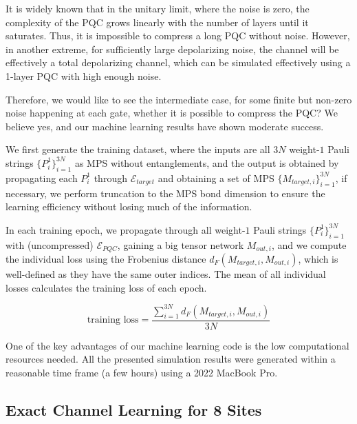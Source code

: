\documentclass[%
 reprint,
superscriptaddress,
 amsmath,amssymb,
 aps,
]{revtex4-2}
\newcommand{\E}{\mathcal{E}}
\begin{document}
It is widely known that in the unitary limit, where the noise is zero, the complexity of the PQC grows linearly with the number of layers until it saturates. Thus, it is impossible to compress a long PQC without noise. However, in another extreme, for sufficiently large depolarizing noise, the channel will be effectively a total depolarizing channel, which can be simulated effectively using a 1-layer PQC with high enough noise.

Therefore, we would like to see the intermediate case, for some finite but non-zero noise happening at each gate, whether it is possible to compress the PQC? We believe yes, and our machine learning results have shown moderate success. 

We first generate the training dataset, where the inputs are all $3N$ weight-$1$ Pauli strings $\{P^1_{i}\}_{i=1}^{3N}$ as MPS without entanglements, and the output is obtained by propagating each $P^1_i$ through $\E_{target}$ and obtaining a set of MPS $\{M_{target, i}\}_{i=1}^{3N}$, if necessary, we perform truncation to the MPS bond dimension to ensure the learning efficiency without losing much of the information.


In each training epoch, we propagate through all weight-$1$ Pauli strings $\{P^1_{i}\}_{i=1}^{3N}$ with (uncompressed) $\E_{PQC}$, gaining a big tensor network $M_{out, i}$, and we compute the individual loss using the Frobenius distance $d_F(M_{target, i}, M_{out, i})$, which is well-defined as they have the same outer indices. The mean of all individual losses calculates the training loss of each epoch.

\begin{equation}
    \text{training loss}=\frac{\sum_{i=1}^{3N}d_F(M_{target, i}, M_{out, i})}{3N}
\end{equation}


One of the key advantages of our machine learning code is the low computational resources needed. All the presented simulation results were generated within a reasonable time frame (a few hours) using a 2022 MacBook Pro. 

\subsection{Exact Channel Learning for 8 Sites}
\end{document}
